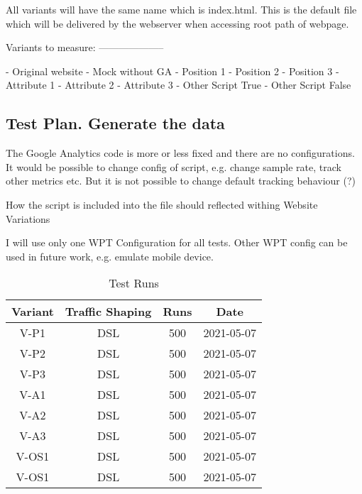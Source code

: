 All variants will have the same name which is index.html. This is the default file which will be delivered by the webserver when accessing root path of webpage.





Variants to measure:
--------------------

- Original website
- Mock without GA
- Position 1
- Position 2
- Position 3
- Attribute 1
- Attribute 2
- Attribute 3
- Other Script True
- Other Script False





\subsection{Test Plan. Generate the data}

The Google Analytics code is more or less fixed and there are no configurations.
It would be possible to change config of script, e.g. change sample rate, track other metrics etc.
But it is not possible to change default tracking behaviour (?)

How the script is included into the file should reflected withing Website Variations

I will use only one WPT Configuration for all tests.
Other WPT config can be used in future work, e.g. emulate mobile device.


\begin{table}[h]
	\caption[Test Runs]{Test Runs \cite{DBLP:books/infix/Schwarz99}}
	\label{tab:tamodelleVergleich}
	\centering
	\begin{tabular}{ |c|c|c|c| } 
	 \hline
	  Variant & Traffic Shaping & Runs & Date \\
	  \hline
	  V-P1 & DSL & 500 & 2021-05-07 \\
	  V-P2 & DSL & 500 & 2021-05-07 \\
	  V-P3 & DSL & 500 & 2021-05-07 \\
	  \hline
	  V-A1 & DSL & 500 & 2021-05-07 \\
	  V-A2 & DSL & 500 & 2021-05-07 \\
	  V-A3 & DSL & 500 & 2021-05-07 \\
	  \hline
	  V-OS1 & DSL & 500 & 2021-05-07 \\
	  V-OS1 & DSL & 500 & 2021-05-07 \\
	  \hline
	  \end{tabular}
\end{table}



